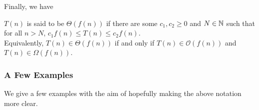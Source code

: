 Finally, we have

\begin{definition}
$T(n)$ is said to be $\Theta(f(n))$ if there are some $c_1,c_2\geq 0$ and $N\in\mathbb{N}$ such that for all $n>N$, $c_1 f(n) \leq T(n)\leq c_2 f(n)$.\\
Equivalently, $T(n) \in \Theta(f(n))$ if and only if $T(n) \in \mathcal{O}(f(n))$ and $T(n) \in \Omega(f(n))$.
\end{definition}

\subsubsection{A Few Examples}

We give a few examples with the aim of hopefully making the above notation more clear.

